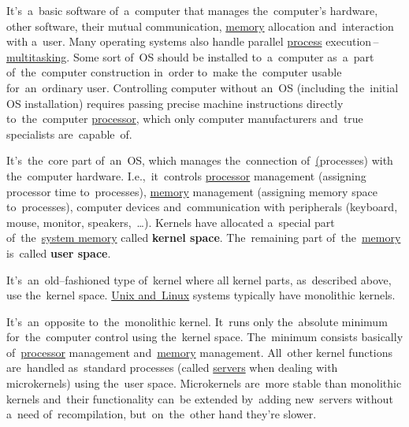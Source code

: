 
\label{os}
It's~a~basic software of~a~computer that manages the~computer's hardware, other software, their mutual communication, \hyperref[systemmemory]{memory} allocation and~interaction with a~user. Many operating systems also handle parallel \hyperref[applicationprocessprogramservicethread]{process} execution\,--\,\hyperref[multitasking]{multitasking}. Some sort of~OS should be installed to~a~computer as~a~part of~the~computer construction in~order to~make the~computer usable for~an~ordinary user. Controlling computer without an~OS (including the~initial OS installation) requires passing precise machine instructions directly to~the~computer \hyperref[processorcpucore]{processor}, which only computer manufacturers and~true specialists are~capable~of.

\label{kernel}
It's~the~core part of~an~OS, which manages the~connection of~\hyperref[applicationprocessprogramservicethread](processes) with the~computer hardware. I.e.,~it~controls \hyperref[processorcpucore]{processor} management (assigning processor time to~processes), \hyperref[systemmemory]{memory} management (assigning memory space to~processes), computer devices and~communication with peripherals (keyboard, mouse, monitor, speakers,~\dots). Kernels have allocated a~special part of~the~\hyperref[systemmemory]{system memory} called \textbf{kernel space}. The~remaining part of~the~\hyperref[systemmemory]{memory} is~called \textbf{user space}.

\label{monolithickernel}
It's~an~old--fashioned type of~kernel where all kernel parts, as~described above, use the~kernel space. \hyperref[unixlinux]{Unix and~Linux} systems typically have monolithic kernels.

\label{microkernel}
It's~an~opposite to~the~monolithic kernel. It~runs only the~absolute minimum for~the~computer control using the~kernel space. The~minimum consists basically of~\hyperref[processorcpucore]{processor} management and~\hyperref[systemmemory]{memory} management. All~other kernel functions are~handled as~standard processes (called \hyperref[server]{servers} when dealing with microkernels) using the~user space. Microkernels are~more stable than monolithic kernels and~their functionality can~be extended by~adding new~servers without a~need of~recompilation, but~on~the~other hand they're slower.

